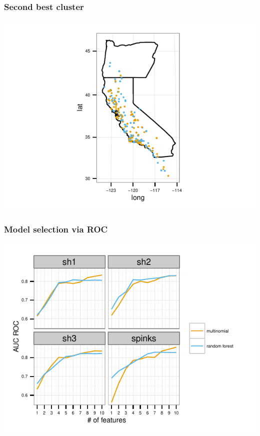 \documentclass{beamer}\usepackage{graphicx, color}
\makeatletter
\def\maxwidth{ %
  \ifdim\Gin@nat@width>\linewidth
    \linewidth
  \else
    \Gin@nat@width
  \fi
}
\newenvironment{knitrout}{}{} %
\makeatother
\begin{document}
\begin{frame}
  \frametitle{Second best cluster}
\begin{knitrout}
\color{fgcolor}
\includegraphics[width=\maxwidth]{figure/unnamed-chunk-3} 

\end{knitrout}


\end{frame}


\begin{frame}[fragile]
  \frametitle{Model selection via ROC}
\begin{knitrout}
\color{fgcolor}
\includegraphics[width=\maxwidth]{figure/roc} 

\end{knitrout}


\end{frame}
\end{document}
